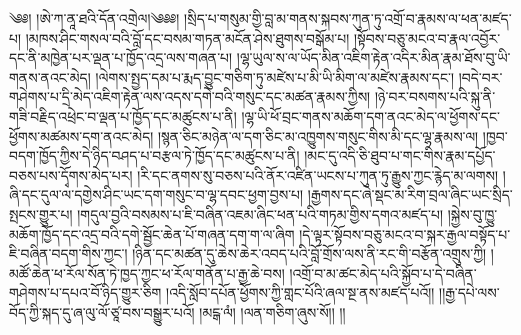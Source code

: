 \setcounter{footnote}{0} 
༄༅། །ཨེ་ཀ་ནཱ་ཐའི་དོན་འགྲེལ།༄༅༅། །སྲིད་པ་གསུམ་གྱི་བླ་མ་གནས་སྐབས་ཀུན་ཏུ་འགྲོ་བ་རྣམས་ལ་ཕན་མཛད་པ། །མཁས་ཤིང་གསལ་བའི་བློ་དང་བསམ་གཏན་མངོན་ཤེས་ཐུགས་བསྒོམ་པ། །སྟོབས་བཅུ་མངའ་བ་རྣལ་འབྱོར་དང་ནི་མཁྱེན་པར་ལྡན་པ་ཁྱོད་འདྲ་ལས་གཞན་པ། །ལྷ་ཡུལ་ས་ལ་ཡོད་མིན་འཇིག་རྟེན་འདིར་མིན་རྣམ་ཐོས་བུ་ཡི་གནས་ནའང་མེད། །ལེགས་སྤྱད་དམ་པ་རྨད་བྱུང་གཅིག་ཏུ་མཛེས་པ་མི་ཡི་མིག་ལ་མཛེས་རྣམས་དང་། །བདེ་བར་གཤེགས་པ་དྲི་མེད་འཇིག་རྟེན་ལས་འདས་དགེ་བའི་གསུང་དང་མཚན་རྣམས་ཀྱིས། །ཉེ་བར་བསགས་པའི་སྐུ་ནི་གཟི་བརྗིད་འཕྲེང་བ་ལྡན་པ་ཁྱོད་དང་མཚུངས་པ་ནི། །ལྷ་ཡི་ཕོ་བྲང་གནས་མཆོག་དག་ནའང་མེད་ལ་ཕྱོགས་དང་ཕྱོགས་མཚམས་དག་ནའང་མེད། །སྙན་ཅིང་མཉེན་ལ་དག་ཅིང་མ་འཁྱུགས་གསུང་གིས་མི་དང་ལྷ་རྣམས་ལ། །ཁྱབ་བདག་ཁྱོད་ཀྱིས་དེ་ཉིད་བཤད་པ་བརྩལ་ཏེ་ཁྱོད་དང་མཚུངས་པ་ནི། །མང་དུ་འདི་ཅི་ཐུབ་པ་གང་གིས་རྣམ་དཔྱོད་བཅས་པས་དྭོགས་མེད་པར། །རི་དང་ནགས་སུ་བཅས་པའི་ནོར་འཛིན་ཡངས་པ་ཀུན་ཏུ་རྒྱུས་ཀྱང་རྙེད་མ་ལགས། །ཞི་དང་དུལ་ལ་དགྱེས་ཤིང་ཡང་དག་གསུང་བ་ལྷ་དབང་ཕྱག་བྱས་པ། །རྒྱགས་དང་ཞེ་སྡང་མ་རིག་བྲལ་ཞིང་ཡང་སྲིད་སྤངས་གྱུར་པ། །གདུལ་བྱའི་བསམས་པ་ཇི་བཞིན་འཇམ་ཞིང་ཕན་པའི་གཏམ་གྱིས་དགའ་མཛད་པ། །སྐྱེས་བུ་ཁྱུ་མཆོག་ཁྱོད་དང་འདྲ་བའི་དགེ་སྦྱོང་ཆེན་པོ་གཞན་དག་ག་ལ་ཞིག །དེ་ལྟར་སྟོབས་བཅུ་མངའ་བ་སྐར་རྒྱལ་བསྟོད་པ་ཇི་བཞིན་བདག་གིས་ཀྱང་། །ཉིན་དང་མཚན་དུ་ཆེས་ཆེར་འབད་པའི་བློ་གྲོས་ལས་ནི་རང་གི་བརྩོན་འགྲུས་ཀྱི། །མཚོ་ཆེན་ཕ་རོལ་སོན་ཏེ་ཁྱད་ཀྱང་ཕ་རོལ་གནོན་པ་རྒྱ་ཆེ་བས། །འགྲོ་བ་མ་ཚང་མེད་པའི་སྐྱོབ་པ་དེ་བཞིན་གཤེགས་པ་དཔའ་བོ་ཉིད་གྱུར་ཅིག །འདི་སློབ་དཔོན་ཕྱོགས་ཀྱི་གླང་པོའི་ཞལ་སྔ་ནས་མཛད་པའོ།། །།རྒྱ་དཔེ་ལས་བོད་ཀྱི་སྐད་དུ་ཞ་ལུ་ལོ་ཙཱ་བས་བསྒྱུར་པའོ། །མངྒ་ལཾ། །ལན་གཅིག་ཞུས་སོ།། །།